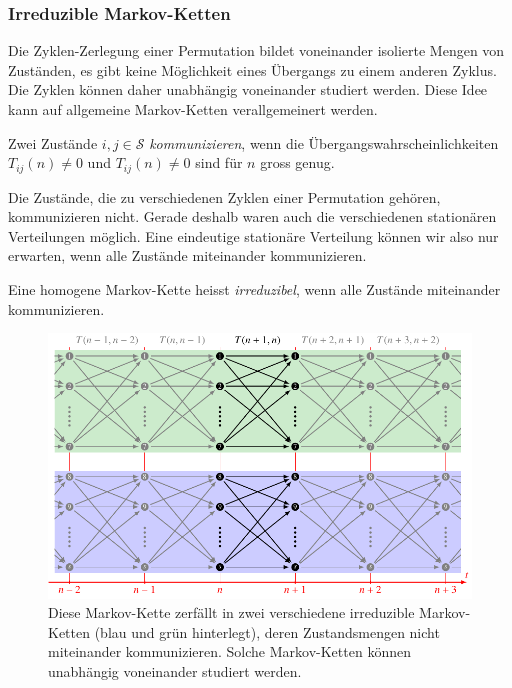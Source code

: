 \subsubsection{Irreduzible Markov-Ketten}
Die Zyklen-Zerlegung einer Permutation bildet voneinander isolierte
Mengen von Zuständen, es gibt keine Möglichkeit eines Übergangs zu
einem anderen Zyklus.
Die Zyklen können daher unabhängig voneinander studiert werden.
Diese Idee kann auf allgemeine Markov-Ketten verallgemeinert werden.

\begin{definition}
Zwei Zustände $i,j\in\mathcal{S}$ {\em kommunizieren}, wenn die
%
Übergangswahrscheinlichkeiten $T_{i\!j}(n) \ne 0$ und $T_{i\!j}(n)\ne 0$ sind
für $n$ gross genug.
\end{definition}

Die Zustände, die zu verschiedenen Zyklen einer Permutation gehören,
kommunizieren nicht.
Gerade deshalb waren auch die verschiedenen stationären Verteilungen
möglich.
Eine eindeutige stationäre Verteilung können wir also nur erwarten,
wenn alle Zustände miteinander kommunizieren.

\begin{definition}
Eine homogene Markov-Kette heisst {\em irreduzibel},
wenn alle Zustände miteinander kommunizieren.
\end{definition}

\begin{figure}
\centering
\includegraphics{chapters/80-wahrscheinlichkeit/images/markov2.pdf}
\caption{Diese Markov-Kette zerfällt in zwei verschiedene irreduzible
Markov-Ketten (blau und grün hinterlegt),
deren Zustandsmengen nicht miteinander kommunizieren.
Solche Markov-Ketten können unabhängig voneinander studiert werden.
\label{buch:wahrscheinlichkeit:fig:markovzerfall}}
\end{figure}

